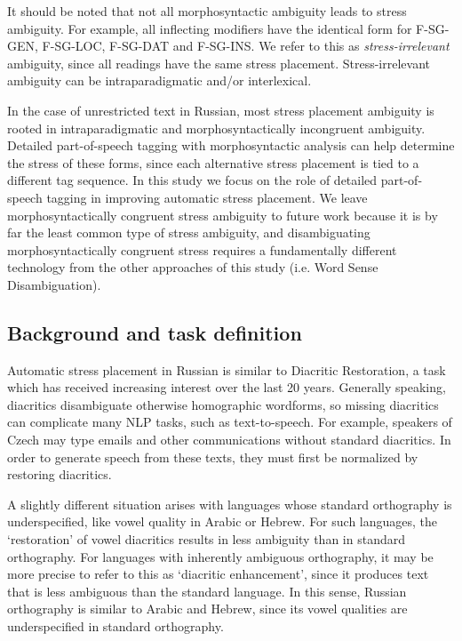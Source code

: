 \documentclass[11pt]{article}
\newcommand{\rr}[1]{\marginpar{\scriptsize R: #1}} %
\begin{document}
It should be noted that not all morphosyntactic ambiguity leads to stress 
ambiguity. For example, all inflecting modifiers have the identical form for 
F-SG-GEN, F-SG-LOC, F-SG-DAT and F-SG-INS. We refer to this as 
\emph{stress-irrelevant} ambiguity, since all readings have
the same stress placement. Stress-irrelevant ambiguity can be intraparadigmatic 
and/or interlexical. 

In the case of unrestricted text in Russian, most stress placement 
ambiguity is rooted in intraparadigmatic and morphosyntactically incongruent 
ambiguity. Detailed part-of-speech tagging with morphosyntactic analysis
can help determine the stress of these forms, since each alternative stress 
placement is tied to a different tag sequence. In this study we focus on 
the role of detailed part-of-speech tagging in improving
automatic stress placement. We leave morphosyntactically congruent stress 
ambiguity to future work because it is by far the least common type of stress
ambiguity, and disambiguating morphosyntactically congruent stress requires 
a fundamentally different technology from the other approaches of this study
(i.e. Word Sense Disambiguation).

\subsection{Background and task definition} \label{background}

Automatic stress placement in Russian is similar to Diacritic Restoration, a task
which has received increasing interest over the last 20 years. Generally 
speaking, diacritics disambiguate otherwise homographic wordforms, so missing 
diacritics can complicate many NLP tasks, such as text-to-speech. For example, 
speakers of Czech may type emails and other communications
without standard diacritics. In order to generate speech from these texts, they 
must first be normalized by restoring diacritics.

A slightly different situation arises with languages whose standard orthography 
is underspecified, like vowel quality in Arabic or Hebrew. For such languages, 
the `restoration' of vowel diacritics results in less ambiguity than in standard 
orthography. For languages with inherently ambiguous orthography,
it may be more precise to refer to this as `diacritic enhancement', since it 
produces text that is less ambiguous than the standard language. In this sense, 
Russian orthography is similar to Arabic and Hebrew, since its vowel qualities 
are underspecified in standard orthography.
\end{document}

